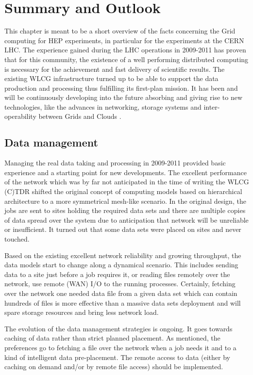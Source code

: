 
\section{Summary and Outlook}

This chapter  is meant to be a short overview of the facts concerning
the Grid computing for HEP experiments, in particular for the
experiments at the CERN LHC. The experience gained during the LHC
operations in 2009-2011 has proven that for this community, the
existence of a well performing distributed computing is necessary
for the achievement and fast delivery of scientific results. The
existing WLCG infrastructure turned up to be able to support the
data production and processing thus fulfilling its first-plan
mission. It has been and will be continuously developing into the
future absorbing and giving rise to new technologies, like the
advances in networking, storage systems and inter-operability
between Grids and Clouds \cite{Cloud}\cite{Cloud2}.

\subsection{Data management}

Managing the real data taking and processing in
2009-2011 provided basic experience and a starting point for new
developments. The excellent performance of the network which was by
far not anticipated in the time of writing the WLCG (C)TDR shifted
the original concept of computing models based on hierarchical
architecture to a more symmetrical mesh-like scenario. In the original
design, the jobs are sent to sites holding the required data sets
and there are multiple copies of data spread over the system due to
anticipation that network will be unreliable or insufficient. It
turned out that some data sets were placed on sites and never
touched.

Based on the existing excellent network reliability and growing
throughput, the data models start to change along a dynamical
scenario. This includes sending data to a site just before a job
requires it, or reading files remotely over the network, use remote
(WAN) I/O to the running processes. Certainly, fetching over the
network one needed data file from a given data set which can contain
hundreds of files is more effective than a massive data sets
deployment and will spare storage resources and bring less network
load.

The evolution of the data management strategies is ongoing. It goes
towards caching of data rather than strict planned placement. As
mentioned, the preferences go to fetching a file over the network
when a job needs it and to a kind of intelligent data pre-placement.
The remote access to data (either by caching on demand and/or by
remote file access) should be implemented.


